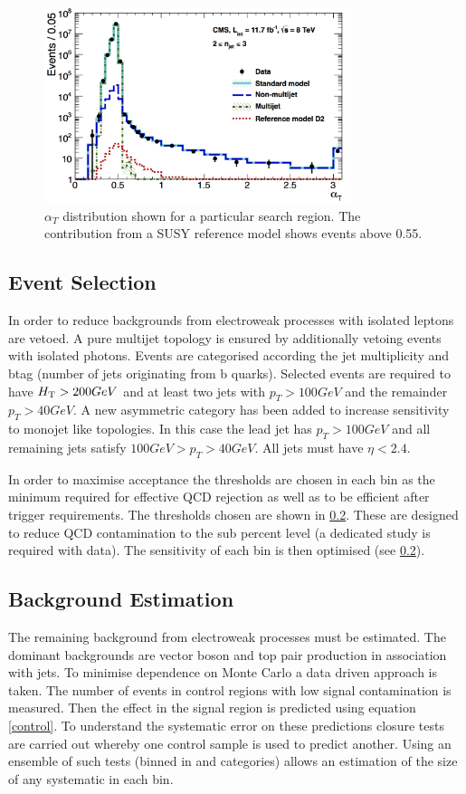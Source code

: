 \begin{figure}
\centering
    \includegraphics[width=0.8\textwidth]{Figures/sample_aT.jpg}
  \caption{$\alpha_T$ distribution shown for a particular search region. The contribution from a SUSY reference model shows events above 0.55.}
  \label{alphdis}
\end{figure}

\subsection{Event Selection}
In order to reduce backgrounds from electroweak processes with isolated leptons are vetoed. A pure multijet topology is ensured by additionally vetoing events with isolated photons. Events are categorised according the jet multiplicity and btag (number of jets originating from b quarks). Selected events are required to have $\mbox{$H_\text{T}$} > 200 GeV$ and at least two jets with $p_T > 100GeV$ and the remainder $p_T > 40GeV$. A new asymmetric category has been added to increase sensitivity to monojet like topologies. In this case the lead jet has $p_T > 100 GeV$ and all remaining jets satisfy $100 GeV > p_T > 40GeV$. All jets must have $\eta < 2.4$.

In order to maximise acceptance the \alphat thresholds are chosen in each \scalht bin as the minimum required for effective QCD rejection as well as to be efficient after trigger requirements. The thresholds chosen are shown in \ref{}. These are designed to reduce QCD contamination to the sub percent level (a dedicated study is required with data). The sensitivity of each bin is then optimised (see \ref{}). 


\subsection{Background Estimation}
The remaining background from electroweak processes must be estimated. The dominant backgrounds are vector boson and top pair production in association with jets. To minimise dependence on Monte Carlo a data driven approach is taken. The number of events in control regions with low signal contamination is measured. Then the effect in the signal region is predicted using equation \ref{control}. To understand the systematic error on these predictions closure tests are carried out whereby one control sample is used to predict another. Using an ensemble of such tests (binned in \scalht and categories) allows an estimation of the size of any systematic in each bin.

